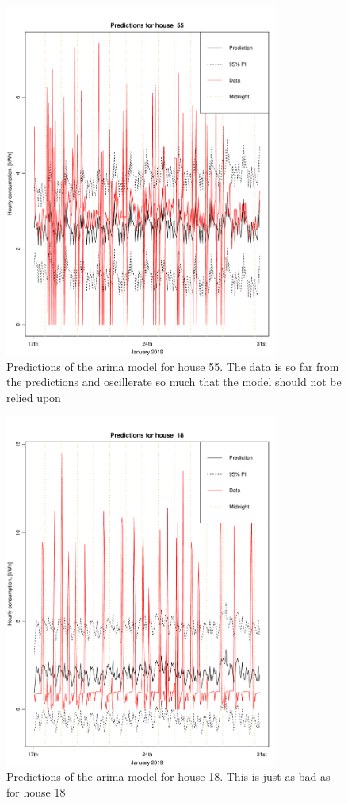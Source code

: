 \begin{figure}
    \centering
    \includegraphics[width=0.8\textwidth]{../../../figures/arimax/arima1_pred_55.pdf}
    \caption{Predictions of the arima model for house 55. The data is so far from the predictions and oscillerate so much that the model should not be relied upon}
    \label{fig:arima1_pred_55}
\end{figure}    

\begin{figure}
    \centering
    \includegraphics[width=0.8\textwidth]{../../../figures/arimax/arima1_pred_18.pdf}
    \caption{Predictions of the arima model for house 18. This is just as bad as for house 18}
    \label{fig:arima1_pred_18}
\end{figure}    


